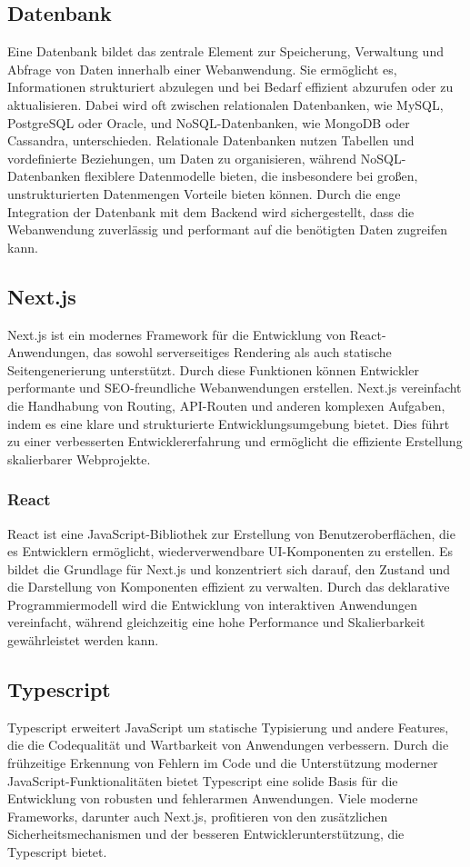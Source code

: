 \begin{inhalt}
\subsection{Datenbank}

Eine Datenbank bildet das zentrale Element zur Speicherung, Verwaltung und Abfrage von Daten innerhalb einer Webanwendung. Sie ermöglicht es, Informationen strukturiert abzulegen und bei Bedarf effizient abzurufen oder zu aktualisieren. Dabei wird oft zwischen relationalen Datenbanken, wie MySQL, PostgreSQL oder Oracle, und NoSQL-Datenbanken, wie MongoDB oder Cassandra, unterschieden. Relationale Datenbanken nutzen Tabellen und vordefinierte Beziehungen, um Daten zu organisieren, während NoSQL-Datenbanken flexiblere Datenmodelle bieten, die insbesondere bei großen, unstrukturierten Datenmengen Vorteile bieten können. Durch die enge Integration der Datenbank mit dem Backend wird sichergestellt, dass die Webanwendung zuverlässig und performant auf die benötigten Daten zugreifen kann.

\subsection{Next.js}
Next.js ist ein modernes Framework für die Entwicklung von React-Anwendungen, das sowohl serverseitiges Rendering als auch statische Seitengenerierung unterstützt. Durch diese Funktionen können Entwickler performante und SEO-freundliche Webanwendungen erstellen. Next.js vereinfacht die Handhabung von Routing, API-Routen und anderen komplexen Aufgaben, indem es eine klare und strukturierte Entwicklungsumgebung bietet. Dies führt zu einer verbesserten Entwicklererfahrung und ermöglicht die effiziente Erstellung skalierbarer Webprojekte.

\subsubsection{React}
React ist eine JavaScript-Bibliothek zur Erstellung von Benutzeroberflächen, die es Entwicklern ermöglicht, wiederverwendbare UI-Komponenten zu erstellen. Es bildet die Grundlage für Next.js und konzentriert sich darauf, den Zustand und die Darstellung von Komponenten effizient zu verwalten. Durch das deklarative Programmiermodell wird die Entwicklung von interaktiven Anwendungen vereinfacht, während gleichzeitig eine hohe Performance und Skalierbarkeit gewährleistet werden kann.

\subsection{Typescript}
Typescript erweitert JavaScript um statische Typisierung und andere Features, die die Codequalität und Wartbarkeit von Anwendungen verbessern. Durch die frühzeitige Erkennung von Fehlern im Code und die Unterstützung moderner JavaScript-Funktionalitäten bietet Typescript eine solide Basis für die Entwicklung von robusten und fehlerarmen Anwendungen. Viele moderne Frameworks, darunter auch Next.js, profitieren von den zusätzlichen Sicherheitsmechanismen und der besseren Entwicklerunterstützung, die Typescript bietet.


\end{inhalt}
